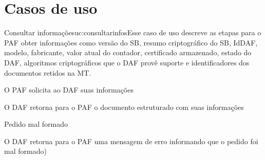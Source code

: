 \documentclass[11pt]{../../classes/univaliarticle}
\begin{document}
\section{Casos de uso}\label{sec:casos_de_uso}


\begin{usecase}{Consultar informações}{uc:consultarinfos}{Esse caso de uso descreve as etapas para o PAF obter informações como versão do SB, resumo criptográfico do SB, IdDAF, modelo, fabricante, valor atual do contador, certificado armazenado, estado do DAF, algoritmos criptográficos que o DAF provê suporte e identificadores dos documentos retidos na MT.}
    \begin{cabecalhoUC}
    \end{cabecalhoUC}

    \begin{fluxoprincipal}
        \item O PAF solicita ao DAF suas informações
        \item O DAF retorna para o PAF o documento estruturado com suas informações
    \end{fluxoprincipal}

    \begin{fluxoexcecao}{Pedido mal formado}
        \item O DAF retorna para o PAF uma mensagem de erro informando que o pedido foi mal formado)
    \end{fluxoexcecao}
\end{usecase}



\end{document}
